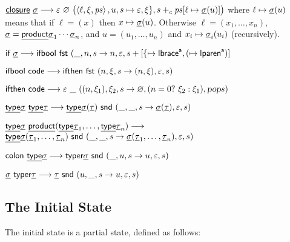 \documentclass{llncs}
\begin{document}
\blist
    \item $\closure\ \tsig \longto \epsilon\ \varnothing\ \bigl(\gen{\ell,\xi,{\it ps}},u,s\mapsto\epsilon,\xi\},s+_c{\it ps}[\ell\mapsto\tsig(u)]\bigr)$ where $\ell\mapsto{\underline{\mathsf{\sigma}}}(u)$ means that if
        $\ell=(x)$ then $x\mapsto {\underline{\mathsf{\sigma}}}(u)$.
        Otherwise $\ell=(x_1,\dots,x_n)$, ${\underline{\mathsf{\sigma}}}=\underline{\mathsf{product}}{\underline{\mathsf{\sigma}}}_1\cdots{\underline{\mathsf{\sigma}}}_n$, and $u=(u_1,\dots,u_n)$ and $x_i\mapsto{\underline{\mathsf{\sigma}}}_i(u_i)$ (recursively).
\elist

\blist
    \item $\iif\ \tsig \longto \ifbool\ \fst\ (\_,n,s\to n,\epsilon,s+[\{\mapsto\Lbrace\a,(\mapsto\lparen\a)]$
    \item $\ifbool\ \code \longto \ifthen\ \fst\ (n,\xi,s\to(n,\xi),\epsilon,s)$
    \item $\ifthen\ \code \longto \epsilon\ \_\ ((n,\xi_1),\xi_2,s\to\varnothing,(n=0?\ \xi_2:\xi_1),\pop s)$
\elist

\blist
    \item $\underline{\mathsf{type}}{\underline{\mathsf{\sigma}}}\ \underline{\mathsf{type}}{\underline{\mathsf{\tau}}} \longrightarrow \underline{\mathsf{type}}{\underline{\mathsf{\sigma}}}({\underline{\mathsf{\tau}}})\ \mathsf{snd}\ (\_,\_,s\to {\underline{\mathsf{\sigma}}}({\underline{\mathsf{\tau}}}),\varepsilon,s)$
    \item $\tp\tsig\ \product(\tp\ttau_1,\dots,\tp\ttau_n) \longto$\hfil\break\null\hfill$\underline{\mathsf{type}}{\underline{\mathsf{\sigma}}}({\underline{\mathsf{\tau}}}_1,\dots,{\underline{\mathsf{\tau}}}_n)\ \mathsf{snd}\ (\_,\_,s\to {\underline{\mathsf{\sigma}}}({\underline{\mathsf{\tau}}}_1,\dots,{\underline{\mathsf{\tau}}}_n),\varepsilon,s)$
    \item $\ccolon\ \tp\tsig \longto \typer\tsig\ \snd\ (\_,u,s\to u,\epsilon,s)$
    \item $\tsig\ \typer\ttau \longto \ttau\ \snd\ (u,\_,s\to u,\epsilon,s)$
\elist

\subsection{The Initial State}

The initial state is a partial state, defined as follows:

\bigskip
\end{document}

